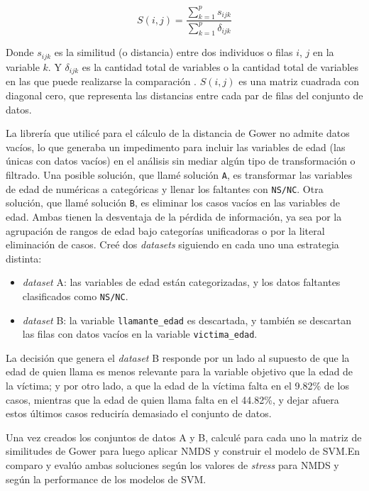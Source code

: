\documentclass[10 pt]{article}
\begin{document}
\[S(i,j) = \frac{\sum_{k=1}^{p}  s_{ijk}}{\sum_{k=1}^{p} \delta_{ijk}}\]

Donde \(s_{ijk}\) es la similitud (o distancia) entre dos individuos o filas \(i\), \(j\) en la variable \(k\). Y \(\delta_{ijk}\) es la cantidad total de variables o la cantidad total de variables en las que puede realizarse la comparación \citetext{\citealp[p. 859-860]{gower1971general}}. \(S(i,j)\) es una matriz cuadrada con diagonal cero, que representa las distancias entre cada par de filas del conjunto de datos.

La librería que utilicé para el cálculo de la distancia de Gower no admite datos vacíos, lo que generaba un impedimento para incluir las variables de edad (las únicas con datos vacíos) en el análisis sin mediar algún tipo de transformación o filtrado. Una posible solución, que llamé solución \texttt{A}, es transformar las variables de edad de numéricas a categóricas y llenar los faltantes con \texttt{NS/NC}. Otra solución, que llamé solución \texttt{B}, es eliminar los casos vacíos en las variables de edad. Ambas tienen la desventaja de la pérdida de información, ya sea por la agrupación de rangos de edad bajo categorías unificadoras o por la literal eliminación de casos. Creé dos \textit{datasets} siguiendo en cada uno una estrategia distinta:
\begin{itemize}
    \item \textit{dataset} A: las variables de edad están categorizadas, y los datos faltantes clasificados como \texttt{NS/NC}.
    \item  \textit{dataset} B: la variable \texttt{llamante\_edad} es descartada, y también se descartan las filas con datos vacíos en la variable \texttt{victima\_edad}.
\end{itemize}

La decisión que genera el \textit{dataset} B responde por un lado al supuesto de que la edad de quien llama es menos relevante para la variable objetivo que la edad de la víctima; y por otro lado, a que la edad de la víctima falta en el 9.82\% de los casos, mientras que la edad de quien llama falta en el 44.82\%, y dejar afuera estos últimos casos reduciría demasiado el conjunto de datos. 

Una vez creados los conjuntos de datos A y B, calculé para cada uno la matriz de similitudes de Gower para luego aplicar NMDS y construir el modelo de SVM.\@ En  comparo y evalúo ambas soluciones según los valores de \textit{stress} para NMDS y según la performance de los modelos de SVM.
\end{document}
